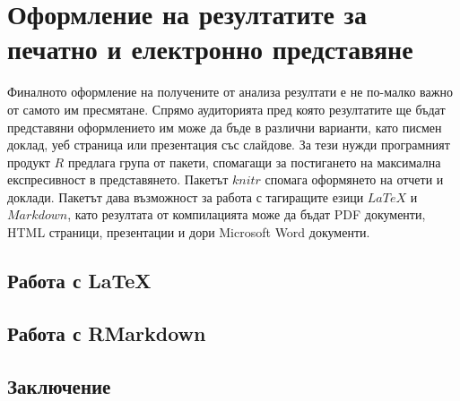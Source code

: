 ﻿\newpage
\chapter{Оформление на резултатите за печатно и електронно представяне}
\label{chapter11}
\thispagestyle{empty}

Финалното оформление на получените от анализа резултати е не по-малко важно от самото им пресмятане. Спрямо аудиторията пред която резултатите ще бъдат представяни оформлението им може да бъде в различни варианти, като писмен доклад, уеб страница или презентация със слайдове. За тези нужди програмният продукт $R$ предлага група от пакети, спомагащи за постигането на максимална експресивност в представянето. Пакетът $knitr$ спомага оформянето на отчети и доклади. Пакетът дава възможност за работа с тагиращите езици $LaTeX$ и $Markdown$, като резултата от компилацията може да бъдат PDF документи, HTML страници, презентации и дори Microsoft Word документи. 

\section{Работа с LaTeX}

\section{Работа с RMarkdown}

\section*{Заключение}



